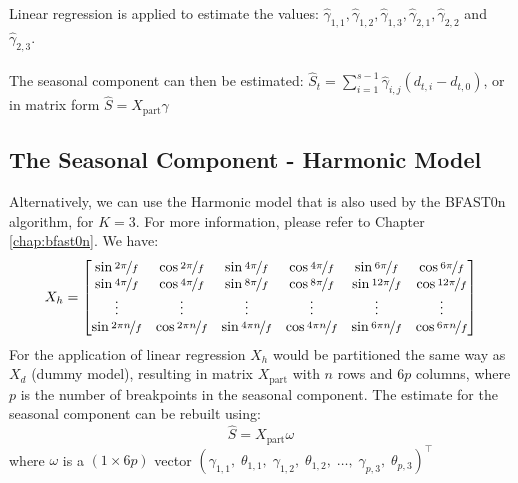 \documentclass[main.tex]{subfiles}
\begin{document}
Linear regression is applied to estimate the values:
$\hat{\gamma}_{1,1}, \hat{\gamma}_{1,2}, \hat{\gamma}_{1,3}, \hat{\gamma}_{2,1},
\hat{\gamma}_{2,2}$ and $\hat{\gamma}_{2,3}$.\\\\
The seasonal component can then be estimated:
$\hat{S}_t = \sum_{i=1}^{s-1}\hat{\gamma}_{i,j}(d_{t,i} - d_{t,0})$, or in
matrix form $\hat{S} = X_{\text{part}} \gamma$

\subsection{The Seasonal Component - Harmonic Model}
\label{subsec:seasonal_harmonic}
Alternatively, we can use the Harmonic model that is also used by the
BFAST0n algorithm, for $K=3$. For more information, please refer to Chapter
\ref{chap:bfast0n}. We have:
\[
X_{h} =
\begin{bmatrix}
  \sin\nicefrac{2 \pi}{f} & \cos\nicefrac{2 \pi}{f} & \sin\nicefrac{4 \pi}{f} & \cos\nicefrac{4
    \pi}{f} &  \sin\nicefrac{6 \pi}{f} & \cos\nicefrac{6 \pi}{f} \\
  \sin\nicefrac{4 \pi}{f} & \cos\nicefrac{4 \pi}{f} & \sin\nicefrac{8 \pi}{f} & \cos\nicefrac{8
    \pi}{f} &  \sin\nicefrac{12 \pi}{f} & \cos\nicefrac{12 \pi}{f} \\
  \vdots & \vdots  & \vdots & \vdots & \vdots & \vdots \\
  \sin\nicefrac{2 \pi n}{f} & \cos\nicefrac{2 \pi n}{f} & \sin\nicefrac{4 \pi n}{f} &
  \cos\nicefrac{4 \pi n}{f} &  \sin\nicefrac{6 \pi n}{f} & \cos\nicefrac{6 \pi n}{f}
\end{bmatrix}
\]
For the application of linear regression $X_h$ would be partitioned the same way
as $X_d$ (dummy model), resulting in matrix $X_{\text{part}}$ with $n$ rows and
$6p$ columns, where $p$ is the number of breakpoints in the seasonal component.
The estimate for the seasonal component can be rebuilt using:
\[
\hat{S} = X_{\text{part}} \omega
\]
where $\omega$ is a $(1 \times 6p)$ vector
$(\gamma_{1, 1}, \; \theta_{1, 1},\;  \gamma_{1, 2},\;  \theta_{1, 2},\;
\hdots,\;  \gamma_{p, 3},\;  \theta_{p, 3})^{\top}$
\end{document}
